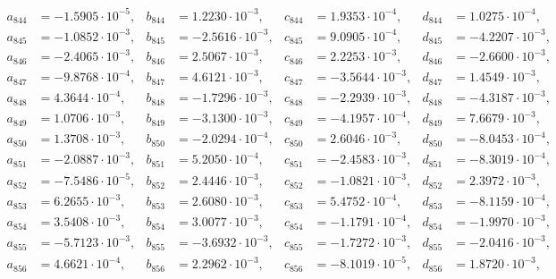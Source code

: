 \begin{align*}
  a_{ 844 } &= -1.5905 \cdot 10^{ -5 }, & b_{ 844 } &= 1.2230 \cdot 10^{ -3 }, & c_{ 844 } &= 1.9353 \cdot 10^{ -4 }, & d_{ 844 } &= 1.0275 \cdot 10^{ -4 }, \\ 
  a_{ 845 } &= -1.0852 \cdot 10^{ -3 }, & b_{ 845 } &= -2.5616 \cdot 10^{ -3 }, & c_{ 845 } &= 9.0905 \cdot 10^{ -4 }, & d_{ 845 } &= -4.2207 \cdot 10^{ -3 }, \\ 
  a_{ 846 } &= -2.4065 \cdot 10^{ -3 }, & b_{ 846 } &= 2.5067 \cdot 10^{ -3 }, & c_{ 846 } &= 2.2253 \cdot 10^{ -3 }, & d_{ 846 } &= -2.6600 \cdot 10^{ -3 }, \\ 
  a_{ 847 } &= -9.8768 \cdot 10^{ -4 }, & b_{ 847 } &= 4.6121 \cdot 10^{ -3 }, & c_{ 847 } &= -3.5644 \cdot 10^{ -3 }, & d_{ 847 } &= 1.4549 \cdot 10^{ -3 }, \\ 
  a_{ 848 } &= 4.3644 \cdot 10^{ -4 }, & b_{ 848 } &= -1.7296 \cdot 10^{ -3 }, & c_{ 848 } &= -2.2939 \cdot 10^{ -3 }, & d_{ 848 } &= -4.3187 \cdot 10^{ -3 }, \\ 
  a_{ 849 } &= 1.0706 \cdot 10^{ -3 }, & b_{ 849 } &= -3.1300 \cdot 10^{ -3 }, & c_{ 849 } &= -4.1957 \cdot 10^{ -4 }, & d_{ 849 } &= 7.6679 \cdot 10^{ -3 }, \\ 
  a_{ 850 } &= 1.3708 \cdot 10^{ -3 }, & b_{ 850 } &= -2.0294 \cdot 10^{ -4 }, & c_{ 850 } &= 2.6046 \cdot 10^{ -3 }, & d_{ 850 } &= -8.0453 \cdot 10^{ -4 }, \\ 
  a_{ 851 } &= -2.0887 \cdot 10^{ -3 }, & b_{ 851 } &= 5.2050 \cdot 10^{ -4 }, & c_{ 851 } &= -2.4583 \cdot 10^{ -3 }, & d_{ 851 } &= -8.3019 \cdot 10^{ -4 }, \\ 
  a_{ 852 } &= -7.5486 \cdot 10^{ -5 }, & b_{ 852 } &= 2.4446 \cdot 10^{ -3 }, & c_{ 852 } &= -1.0821 \cdot 10^{ -3 }, & d_{ 852 } &= 2.3972 \cdot 10^{ -3 }, \\ 
  a_{ 853 } &= 6.2655 \cdot 10^{ -3 }, & b_{ 853 } &= 2.6080 \cdot 10^{ -3 }, & c_{ 853 } &= 5.4752 \cdot 10^{ -4 }, & d_{ 853 } &= -8.1159 \cdot 10^{ -4 }, \\ 
  a_{ 854 } &= 3.5408 \cdot 10^{ -3 }, & b_{ 854 } &= 3.0077 \cdot 10^{ -3 }, & c_{ 854 } &= -1.1791 \cdot 10^{ -4 }, & d_{ 854 } &= -1.9970 \cdot 10^{ -3 }, \\ 
  a_{ 855 } &= -5.7123 \cdot 10^{ -3 }, & b_{ 855 } &= -3.6932 \cdot 10^{ -3 }, & c_{ 855 } &= -1.7272 \cdot 10^{ -3 }, & d_{ 855 } &= -2.0416 \cdot 10^{ -3 }, \\ 
  a_{ 856 } &= 4.6621 \cdot 10^{ -4 }, & b_{ 856 } &= 2.2962 \cdot 10^{ -3 }, & c_{ 856 } &= -8.1019 \cdot 10^{ -5 }, & d_{ 856 } &= 1.8720 \cdot 10^{ -3 }, \\ 

\end{align*}
